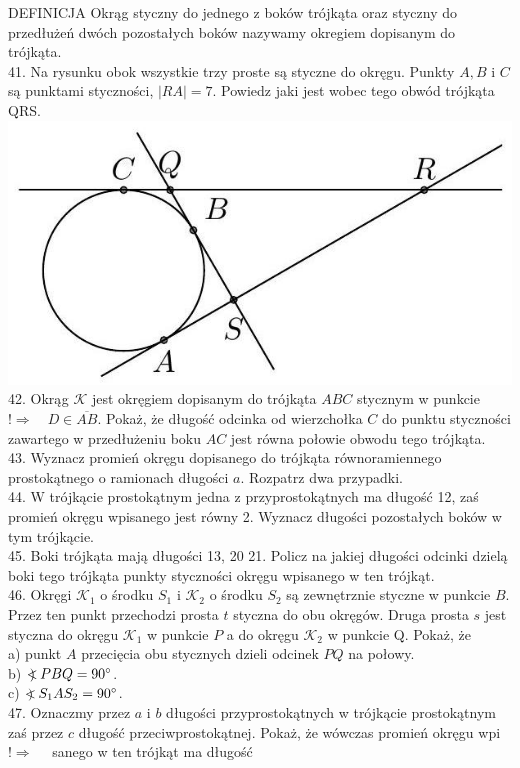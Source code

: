 \documentclass[10pt]{article}
\newcommand\Varangle{\mathop{{<\!\!\!\!\!\text{\small)}}\:}\nolimits}
\begin{document}
DEFINICJA Okrąg styczny do jednego z boków trójkąta oraz styczny do przedłużeń dwóch pozostałych boków nazywamy okregiem dopisanym do trójkąta.\\
41. Na rysunku obok wszystkie trzy proste są styczne do okręgu. Punkty \(A, B\) i \(C\) są punktami styczności, \(|R A|=7\). Powiedz jaki jest wobec tego obwód trójkąta QRS.\\
\includegraphics[max width=\textwidth, center]{2024_11_21_e9b4faa005d5be2cc318g-041}\\
42. Okrąg \(\mathcal{K}\) jest okręgiem dopisanym do trójkąta \(A B C\) stycznym w punkcie\\
\(!\Rightarrow \quad D \in \overline{A B}\). Pokaż, że długość odcinka od wierzchołka \(C\) do punktu styczności zawartego w przedłużeniu boku \(A C\) jest równa połowie obwodu tego trójkąta.\\
43. Wyznacz promień okręgu dopisanego do trójkąta równoramiennego prostokątnego o ramionach długości \(a\). Rozpatrz dwa przypadki.\\
44. W trójkącie prostokątnym jedna z przyprostokątnych ma długość 12, zaś promień okręgu wpisanego jest równy 2. Wyznacz długości pozostałych boków w tym trójkącie.\\
45. Boki trójkąta mają długości 13, 20 21. Policz na jakiej długości odcinki dzielą boki tego trójkąta punkty styczności okręgu wpisanego w ten trójkąt.\\
46. Okręgi \(\mathcal{K}_{1}\) o środku \(S_{1}\) i \(\mathcal{K}_{2}\) o środku \(S_{2}\) są zewnętrznie styczne w punkcie \(B\). Przez ten punkt przechodzi prosta \(t\) styczna do obu okręgów. Druga prosta \(s\) jest styczna do okręgu \(\mathcal{K}_{1}\) w punkcie \(P\) a do okręgu \(\mathcal{K}_{2}\) w punkcie Q. Pokaż, że\\
a) punkt \(A\) przecięcia obu stycznych dzieli odcinek \(P Q\) na połowy.\\
b) \(\Varangle P B Q=90^{\circ}\).\\
c) \(\Varangle S_{1} A S_{2}=90^{\circ}\).\\
47. Oznaczmy przez \(a\) i \(b\) długości przyprostokątnych w trójkącie prostokątnym zaś przez \(c\) długość przeciwprostokątnej. Pokaż, że wówczas promień okręgu wpi\(!\Rightarrow \quad\) sanego w ten trójkąt ma długość
\end{document}
